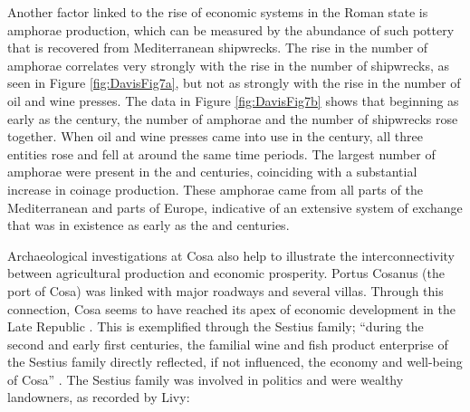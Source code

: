 





Another factor linked to the rise of economic systems in the Roman state is amphorae production, which can be measured by the abundance of such pottery that is recovered from Mediterranean shipwrecks. The rise in the number of amphorae correlates very strongly with the rise in the number of shipwrecks, as seen in Figure \ref{fig:DavisFig7a}, but not as strongly with the rise in the number of oil and wine presses. The data in Figure \ref{fig:DavisFig7b} shows that beginning as early as the  century\BC, the number of amphorae and the number of shipwrecks rose together. When oil and wine presses came into use in the  century\BC, all three entities rose and fell at around the same time periods. The largest number of amphorae were present in the  and  centuries\BC, coinciding with a substantial increase in coinage production. These amphorae came from all parts of the Mediterranean and parts of Europe, indicative of an extensive system of exchange that was in existence as early as the  and  centuries\BC.




Archaeological investigations at Cosa also help to illustrate the interconnectivity between agricultural production and economic prosperity. 
Portus Cosanus (the port of Cosa) was linked with major roadways and several villas. Through this connection, Cosa seems to have reached its apex of economic development in the Late Republic \parencite[124]{Manacorda_1978}. This is exemplified through the Sestius family; “during the second and early first centuries\BC, the familial wine and fish product enterprise of the Sestius family directly reflected, if not influenced, the economy and well-being of Cosa” \parencite[15]{Moore_1995}. 
The Sestius family was involved in politics and were wealthy landowners, as recorded by Livy:


